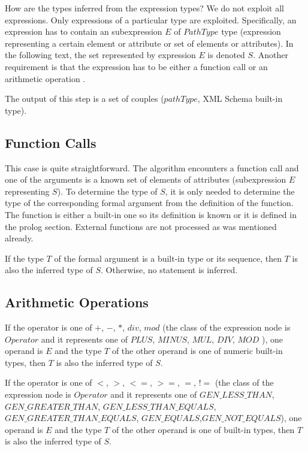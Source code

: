 How are the types inferred from the expression types? We do not exploit all expressions. Only expressions of a particular type are exploited. Specifically, an expression has to contain an subexpression $E$ of $PathType$ type (expression representing a certain element or attribute or set of elements or attributes). In the following text, the set represented by expression $E$ is denoted $S$. Another requirement is that the expression has to be either a function call or an arithmetic operation .

The output of this step is a set of couples ($pathType$, XML Schema built-in type).


\subsection{Function Calls}
This case is quite straightforward. The algorithm encounters a function call and one of the arguments is a known set of elements of attributes (subexpression $E$ representing $S$). To determine the type of $S$, it is only needed to determine the type of the corresponding formal argument from the definition of the function. The function is either a built-in one so its definition is known or it is defined in the prolog section. External functions are not processed as was mentioned already.

If the type $T$ of the formal argument is a built-in type or its sequence, then $T$ is also the inferred type of $S$. Otherwise, no statement is inferred.

\subsection{Arithmetic Operations}
If the operator is one of $+$, $-$, $*$, $div$, $mod$ (the class of the expression node is $Operator$ and it represents one of $PLUS$, $MINUS$, $MUL$, $DIV$, $MOD$ ), one operand is $E$ and the type $T$ of the other operand is one of numeric built-in types, then $T$ is also the inferred type of $S$.

If the operator is one of $<$, $>$, $<=$, $>=$, $=$, $!=$ (the class of the expression node is $Operator$ and it represents one of $GEN\_LESS\_THAN$, \linebreak $GEN\_GREATER\_THAN$, $GEN\_LESS\_THAN\_EQUALS$,\linebreak $GEN\_GREATER\_THAN\_EQUALS$, $GEN\_EQUALS$,\linebreak $GEN\_NOT\_EQUALS$), one operand is $E$ and the type $T$ of the other operand is one of built-in types, then $T$ is also the inferred type of $S$.

